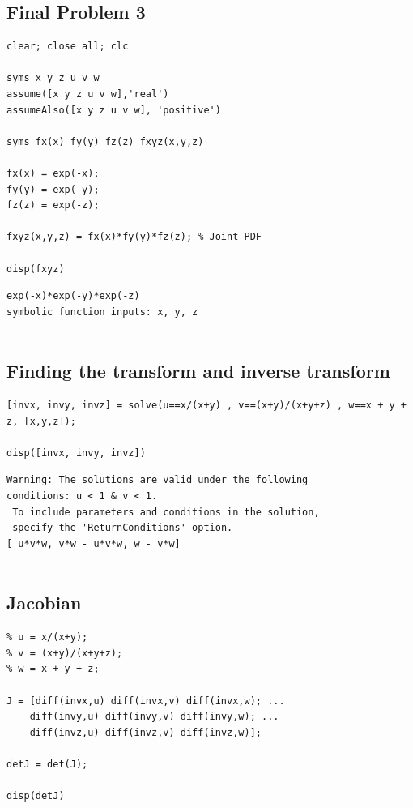 \documentclass[12pt]{article}
\begin{document}
\subsection*{Final Problem 3}

\begin{verbatim}
clear; close all; clc

syms x y z u v w
assume([x y z u v w],'real')
assumeAlso([x y z u v w], 'positive')

syms fx(x) fy(y) fz(z) fxyz(x,y,z)

fx(x) = exp(-x);
fy(y) = exp(-y);
fz(z) = exp(-z);

fxyz(x,y,z) = fx(x)*fy(y)*fz(z); % Joint PDF

disp(fxyz)
\end{verbatim}

        \color{lightgray} \begin{verbatim}exp(-x)*exp(-y)*exp(-z)
symbolic function inputs: x, y, z
 
\end{verbatim} \color{black}
    

\subsection*{Finding the transform and inverse transform}

\begin{verbatim}
[invx, invy, invz] = solve(u==x/(x+y) , v==(x+y)/(x+y+z) , w==x + y + z, [x,y,z]);

disp([invx, invy, invz])
\end{verbatim}

        \color{lightgray} \begin{verbatim}Warning: The solutions are valid under the following
conditions: u < 1 & v < 1.
 To include parameters and conditions in the solution,
 specify the 'ReturnConditions' option. 
[ u*v*w, v*w - u*v*w, w - v*w]
 
\end{verbatim} \color{black}
    

\subsection*{Jacobian}

\begin{verbatim}
% u = x/(x+y);
% v = (x+y)/(x+y+z);
% w = x + y + z;

J = [diff(invx,u) diff(invx,v) diff(invx,w); ...
    diff(invy,u) diff(invy,v) diff(invy,w); ...
    diff(invz,u) diff(invz,v) diff(invz,w)];

detJ = det(J);

disp(detJ)
\end{verbatim}
\end{document}
